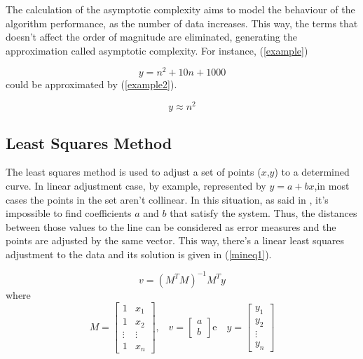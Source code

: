 \documentclass[10pt, conference, compsocconf]{IEEEtran}
\begin{document}
The calculation of the asymptotic complexity aims to model the behaviour
of the algorithm performance, as the number of data increases. This way,
the terms that doesn't affect the order of magnitude are eliminated,
generating the approximation called asymptotic complexity. For instance, (\ref{example})

    \begin{equation}
		y = n^{2} +10 n + 1000
	\label{example}
	\end{equation}
could be approximated by (\ref{example2}).

\begin{equation}
		y \approx  n^{2} 
	\label{example2}
	\end{equation}

\subsection{Least Squares Method}

The least squares method is used to adjust a set of points ($x$,$y$) to a
determined curve. In linear adjustment case, by example, represented by $y = a + bx$,in most cases the points in the set aren't collinear. 
In this situation, as said in \cite{minq}, it's impossible to find coefficients
$a$ and $b$ that satisfy the system. Thus, the distances between those values
to the line can be considered as error measures and the points are adjusted 
by the same vector. This way, there's a linear least 
squares adjustment to the data and its solution is given in (\ref{mineq1}).

\begin{equation}
		v =( M^{T}M)^{-1}M^{T}y
	\label{mineq1}
	\end{equation}
	where
	\begin{equation}
	M = \left[\begin{array}{cc}
               	1 & x_{1} \\
               	1 & x_{2}  \\
		\vdots & \vdots  \\
		1 & x_{n}
          	         \end{array}\right] \mbox{,} \quad
	v = \left[\begin{array}{c}
               	a \\
               	b  
          	         \end{array}\right] \mbox{e} \quad
	y = \left[\begin{array}{c}
               	y_{1} \\
               	y_{2}  \\
	 \vdots  \\
		y_{n}
          	         \end{array}\right] 	
	\label{variaveis}
	\end{equation}
	
\end{document}
